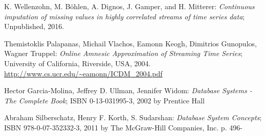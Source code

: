 \documentclass[abstracton,12pt]{scrreprt}
\begin{document}
\begin{thebibliography}{99}
	
	
	 K. Wellenzohn, M. Böhlen, A. Dignos, J. Gamper, and H. Mitterer: \emph{Continuous imputation of missing values in highly correlated streams of time series data}; Unpublished, 2016.
	
	 Themistoklis Palapanas, Michail Vlachos, Eamonn Keogh, Dimitrios Gunopulos, Wagner Truppel: \emph{Online Amnesic Approximation of Streaming Time Series}; University of California, Riverside, USA, 2004. \url{http://www.cs.ucr.edu/~eamonn/ICDM_2004.pdf}

	 Hector Garcia-Molina, Jeffrey D. Ullman, Jennifer Widom: \emph{Database Systems - The Complete Book}; ISBN 0-13-031995-3, 2002 by Prentice Hall
		
	 Abraham Silberschatz, Henry F. Korth, S. Sudarshan: \emph{Database System Concepts}; ISBN 978-0-07-352332-3, 2011 by The McGraw-Hill Companies, Inc. p. 496-



\end{thebibliography}
\end{document}
